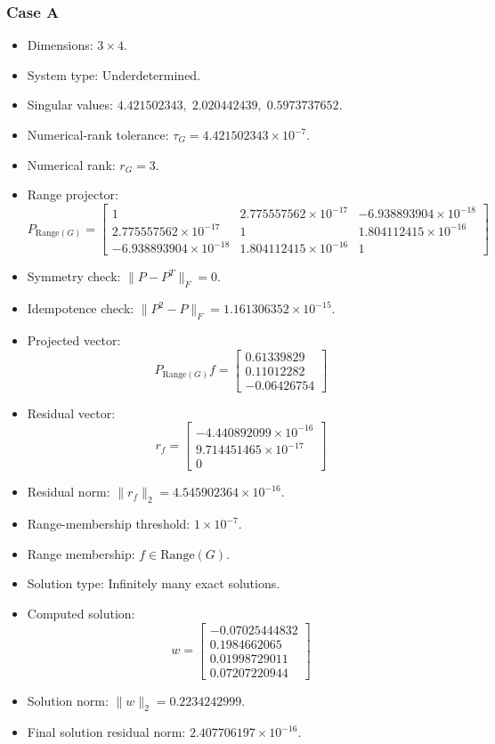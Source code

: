 \subsubsection*{Case A}

\begin{itemize}
\item Dimensions: $3 \times 4$.
\item System type: Underdetermined.
\item Singular values: $4.421502343,\; 2.020442439,\; 0.5973737652$.
\item Numerical-rank tolerance: $\tau_G = 4.421502343\times10^{-7}$.
\item Numerical rank: $r_G = 3$.
\item Range projector:
\[
P_{\mathrm{Range}(G)} = \begin{bmatrix}
1 & 2.775557562\times10^{-17} & -6.938893904\times10^{-18} \\
2.775557562\times10^{-17} & 1 & 1.804112415\times10^{-16} \\
-6.938893904\times10^{-18} & 1.804112415\times10^{-16} & 1
\end{bmatrix}
\]
\item Symmetry check: $\|P-P^T\|_F = 0$.
\item Idempotence check: $\|P^2-P\|_F = 1.161306352\times10^{-15}$.
\item Projected vector:
\[
P_{\mathrm{Range}(G)}f = \begin{bmatrix}
0.61339829 \\
0.11012282 \\
-0.06426754
\end{bmatrix}
\]
\item Residual vector:
\[
r_f = \begin{bmatrix}
-4.440892099\times10^{-16} \\
9.714451465\times10^{-17} \\
0
\end{bmatrix}
\]
\item Residual norm: $\|r_f\|_2 = 4.545902364\times10^{-16}$.
\item Range-membership threshold: $1\times10^{-7}$.
\item Range membership: $f \in \mathrm{Range}(G)$.
\item Solution type: Infinitely many exact solutions.
\item Computed solution:
\[
w = \begin{bmatrix}
-0.07025444832 \\
0.1984662065 \\
0.01998729011 \\
0.07207220944
\end{bmatrix}
\]
\item Solution norm: $\|w\|_2 = 0.2234242999$.
\item Final solution residual norm: $2.407706197\times10^{-16}$.
\end{itemize}

